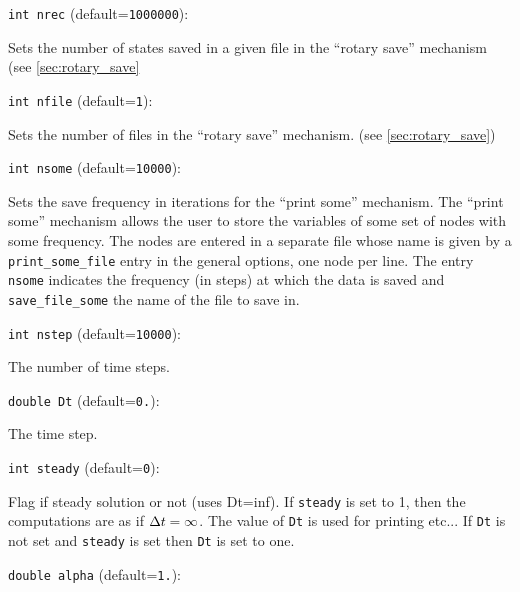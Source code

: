 \item\verb+int nrec+ {\rm(default=\verb|1000000|)}:

Sets the number of states saved in a given file
in the ``rotary save'' mechanism (see \ref{sec:rotary_save}

\item\verb+int nfile+ {\rm(default=\verb|1|)}:

Sets the number of files in the ``rotary save'' mechanism. 
(see \ref{sec:rotary_save})

\item\verb+int nsome+ {\rm(default=\verb|10000|)}:

Sets the save frequency in iterations for the ``print some''
mechanism. 
\label{sec:print_some}
The ``print some'' mechanism allows the user to store the variables of
some set of nodes with some frequency. The nodes are entered in a
separate file whose name is given by a \verb+print_some_file+ entry in
the general options, one node per line. The entry \verb+nsome+
indicates the frequency (in steps) at which the data is saved and
\verb+save_file_some+ the name of the file to save in. 

\item\verb+int nstep+ {\rm(default=\verb|10000|)}:

The number of time steps. 

\item\verb+double Dt+ {\rm(default=\verb|0.|)}:

The time step.

\item\verb+int steady+ {\rm(default=\verb|0|)}:

Flag if steady solution or not (uses Dt=inf). If \verb+steady+
is set to 1, then the computations are as if ${\Delta t}=\infty$. 
The value of \verb+Dt+ is used for printing etc... If \verb+Dt+
is not set and \verb+steady+ is set then \verb+Dt+ is set to one.

\item\verb+double alpha+ {\rm(default=\verb|1.|)}:

